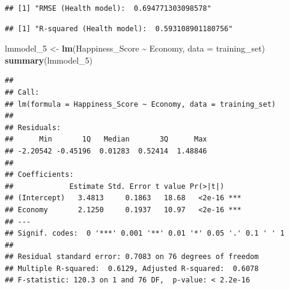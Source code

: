 \documentclass[
  11pt,
]{article}
\newenvironment{Shaded}{\begin{snugshade}}{\end{snugshade}}
\newcommand{\AttributeTok}[1]{\textcolor[rgb]{0.13,0.29,0.53}{#1}}
\newcommand{\DecValTok}[1]{\textcolor[rgb]{0.00,0.00,0.81}{#1}}
\newcommand{\FunctionTok}[1]{\textcolor[rgb]{0.13,0.29,0.53}{\textbf{#1}}}
\newcommand{\NormalTok}[1]{#1}
\newcommand{\OtherTok}[1]{\textcolor[rgb]{0.56,0.35,0.01}{#1}}
\newcommand{\SpecialCharTok}[1]{\textcolor[rgb]{0.81,0.36,0.00}{\textbf{#1}}}
\newcommand{\StringTok}[1]{\textcolor[rgb]{0.31,0.60,0.02}{#1}}
\begin{document}
\begin{Shaded}
\end{Shaded}

\begin{verbatim}
## [1] "RMSE (Health model):  0.694771303098578"
\end{verbatim}

\begin{Shaded}
\end{Shaded}

\begin{verbatim}
## [1] "R-squared (Health model):  0.593108901180756"
\end{verbatim}

\begin{Shaded}
\begin{Highlighting}[]
\NormalTok{lmmodel\_5 }\OtherTok{\textless{}{-}} \FunctionTok{lm}\NormalTok{(Happiness\_Score }\SpecialCharTok{\textasciitilde{}}\NormalTok{ Economy, }\AttributeTok{data =}\NormalTok{ training\_set)}
\FunctionTok{summary}\NormalTok{(lmmodel\_5)}
\end{Highlighting}
\end{Shaded}

\begin{verbatim}
## 
## Call:
## lm(formula = Happiness_Score ~ Economy, data = training_set)
## 
## Residuals:
##      Min       1Q   Median       3Q      Max 
## -2.20542 -0.45196  0.01283  0.52414  1.48846 
## 
## Coefficients:
##             Estimate Std. Error t value Pr(>|t|)    
## (Intercept)   3.4813     0.1863   18.68   <2e-16 ***
## Economy       2.1250     0.1937   10.97   <2e-16 ***
## ---
## Signif. codes:  0 '***' 0.001 '**' 0.01 '*' 0.05 '.' 0.1 ' ' 1
## 
## Residual standard error: 0.7083 on 76 degrees of freedom
## Multiple R-squared:  0.6129, Adjusted R-squared:  0.6078 
## F-statistic: 120.3 on 1 and 76 DF,  p-value: < 2.2e-16
\end{verbatim}
\end{document}
